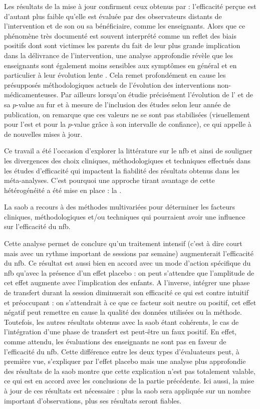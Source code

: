 Les résultats de la mise à jour confirment ceux obtenus par \citet{Cortese2016} : 
l'efficacité perçue est d'autant plus faible qu'elle est évaluée par 
des observateurs distants de l'intervention et de son ou sa bénéficiaire, comme les enseignants. Alors que ce phénomène très documenté est souvent 
interprété comme un reflet des biais positifs dont sont victimes les parents du fait de leur plus grande implication dans la délivrance de 
l'intervention, une analyse approfondie révèle que les enseignants sont également moins sensibles aux symptômes en général et en particulier 
à leur évolution lente \citep{Sollie2013, Narad2015}. 
Cela remet profondément en cause les présupposés méthodologiques actuels de l'évolution des interventions non-médicamenteuses. Par ailleurs
lorsqu'on étudie précisément l'évolution de l' et de sa $p$-value au fur et à mesure de l'inclusion des études selon leur année de publication, 
on remarque que ces valeurs ne se sont pas stabilisées (visuellement pour l'\gls{est} et pour la $p$-value grâce à son intervalle de confiance), 
ce qui appelle à de nouvelles mises à jour.

Ce travail a été l'occasion d'explorer 
la littérature sur le \gls{nfb} et ainsi de souligner les divergences des choix cliniques, méthodologiques et techniques effectués dans les études 
d'efficacité qui impactent la fiabilité
des résultats obtenus dans les méta-analyses. C'est pourquoi une approche tirant avantage de cette hétérogénéité a été mise en place : la .

La \gls{saob} a recours à des méthodes multivariées pour déterminer les facteurs cliniques, méthodologiques et/ou techniques qui pourraient avoir une 
influence sur l'efficacité du \gls{nfb}. 

Cette analyse permet de conclure qu'un traitement intensif (c'est à dire court mais avec un rythme important de sessions par semaine) augmenterait 
l'efficacité du \gls{nfb}. Ce résultat est aussi bien en accord avec un mode d'action spécifique du \gls{nfb} qu'avec la présence d'un effet placebo :
on peut s'attendre que l'amplitude de cet effet augmente avec l'implication des enfants. A l'inverse,  
intégrer une phase de transfert durant la session diminuerait son efficacité ce qui est contre intuitif et préoccupant : on s'attendrait à ce que ce facteur 
soit neutre ou positif, cet effet négatif peut remettre en cause la qualité des données utilisées ou la méthode. Toutefois, les autres résultats obtenus 
avec la \gls{saob} étant cohérents, le cas de l'intégration d'une phase de transfert est peut-être un faux positif. En effet, comme attendu, les évaluations des enseignants ne sont pas en faveur de l'efficacité du \gls{nfb}. 
Cette différence entre les deux types d'évaluateurs peut, à première vue, s'expliquer par l'effet placebo mais une analyse plus approfondie des 
résultats de la \gls{saob} montre que cette explication n'est pas totalement valable, ce qui est en accord avec les conclusions de la partie précédente. 
Ici aussi, la mise à jour de ces résultats est nécessaire : plus la \gls{saob} sera appliquée sur un nombre important d'observations,
plus ses résultats seront fiables.

